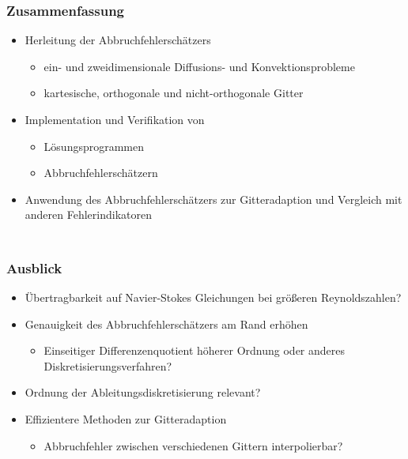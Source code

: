 \documentclass[accentcolor=tud2c,colorbacktitle,inverttitle,landscape,ngerman,presentation,t]{tudbeamer}
\begin{document}
\begin{frame}
  \frametitle{\\Zusammenfassung}
    \begin{itemize}
      \item Herleitung der Abbruchfehlerschätzers
        \begin{itemize}
          \item ein- und zweidimensionale Diffusions- und Konvektionsprobleme
          \item kartesische, orthogonale und nicht-orthogonale Gitter
        \end{itemize}
      \item Implementation und Verifikation von
        \begin{itemize}
          \item Lösungsprogrammen
          \item Abbruchfehlerschätzern
        \end{itemize}
      \item Anwendung des Abbruchfehlerschätzers zur Gitteradaption
        und Vergleich mit anderen Fehlerindikatoren
    \end{itemize}
\end{frame}

\begin{frame}
  \frametitle{\\Ausblick}
    \begin{itemize}
      \item Übertragbarkeit auf Navier-Stokes Gleichungen bei größeren
        Reynoldszahlen?
      \item Genauigkeit des Abbruchfehlerschätzers am Rand erhöhen
        \begin{itemize}
          \item Einseitiger Differenzenquotient höherer Ordnung
            oder anderes Diskretisierungsverfahren?
        \end{itemize}
        \item Ordnung der Ableitungsdiskretisierung relevant?
        \item Effizientere Methoden zur Gitteradaption
          \begin{itemize}
            \item Abbruchfehler zwischen verschiedenen Gittern interpolierbar?
          \end{itemize}
    \end{itemize}
\end{frame}
\end{document}
